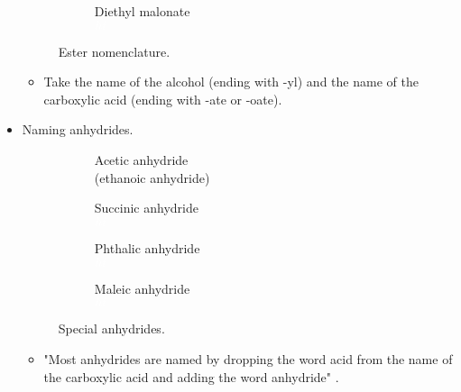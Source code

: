 \documentclass[../notes.tex]{subfiles}
\begin{document}
\begin{itemize}
\begin{figure}[H]
\begin{subfigure}[b]{0.3\linewidth}
            \caption*{\textcolor{rex}{Diethyl} \textcolor{blx}{malonate}\\${\color{white}hi}$}
            \label{fig:esterNomenclaturec}
        \end{subfigure}
        \caption{Ester nomenclature.}
        \label{fig:esterNomenclature}
    \end{figure}
    \begin{itemize}
        \item Take the name of the alcohol (ending with -yl) and the name of the carboxylic acid (ending with -ate or -oate).
    \end{itemize}
    \item Naming anhydrides.
    \begin{figure}[h!]
        \centering
        \footnotesize
        \captionsetup{justification=centering}
        \begin{subfigure}[b]{0.24\linewidth}
            \centering
            \caption*{Acetic anhydride\\(ethanoic anhydride)}
            \label{fig:anhydrideNomenclaturea}
        \end{subfigure}
        \begin{subfigure}[b]{0.24\linewidth}
            \centering
            \caption*{Succinic anhydride\\${\color{white}hi}$}
            \label{fig:anhydrideNomenclatureb}
        \end{subfigure}
        \begin{subfigure}[b]{0.24\linewidth}
            \centering
            \caption*{Phthalic anhydride\\${\color{white}hi}$}
            \label{fig:anhydrideNomenclaturec}
        \end{subfigure}
        \begin{subfigure}[b]{0.24\linewidth}
            \centering
            \caption*{Maleic anhydride\\${\color{white}hi}$}
            \label{fig:anhydrideNomenclatured}
        \end{subfigure}
        \caption{Special anhydrides.}
        \label{fig:anhydrideNomenclature}
    \end{figure}
    \begin{itemize}
        \item "Most anhydrides are named by dropping the word acid from the name of the carboxylic acid and adding the word anhydride" \parencite[766]{bib:SolomonsEtAl}.

\end{itemize}
\end{itemize}
\end{document}

